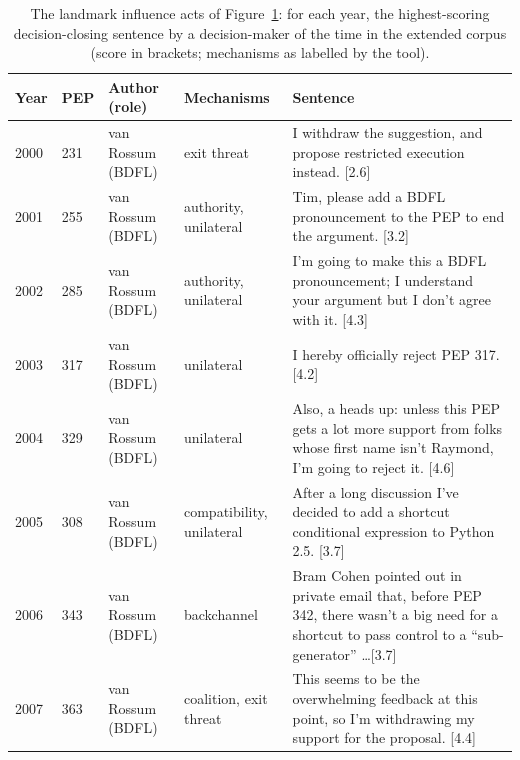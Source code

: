 \begin{figure}[t]
\label{fig:timeline2}
\end{figure}

\begin{table}[t]
\caption{The landmark influence acts of Figure~\ref{fig:timeline2}: for each year, the highest-scoring decision-closing sentence by a decision-maker of the time in the extended corpus (score in brackets; mechanisms as labelled by the tool).}
\label{tab:landmarks}
\footnotesize
\begin{tabular}{p{}p{}p{}p{}p{}}
\toprule
Year & PEP & Author (role) & Mechanisms & Sentence \\
\midrule
2000 & 231 & van Rossum (BDFL) & exit threat & I withdraw the suggestion, and propose restricted execution instead. [2.6] \\
2001 & 255 & van Rossum (BDFL) & authority, unilateral & Tim, please add a BDFL pronouncement to the PEP to end the argument. [3.2] \\
2002 & 285 & van Rossum (BDFL) & authority, unilateral & I'm going to make this a BDFL pronouncement; I understand your argument but I don't agree with it. [4.3] \\
2003 & 317 & van Rossum (BDFL) & unilateral & I hereby officially reject PEP 317. [4.2] \\
2004 & 329 & van Rossum (BDFL) & unilateral & Also, a heads up: unless this PEP gets a lot more support from folks whose first name isn't Raymond, I'm going to reject it. [4.6] \\
2005 & 308 & van Rossum (BDFL) & compatibility, unilateral & After a long discussion I've decided to add a shortcut conditional expression to Python 2.5. [3.7] \\
2006 & 343 & van Rossum (BDFL) & backchannel & Bram Cohen pointed out in private email that, before PEP 342, there wasn't a big need for a shortcut to pass control to a ``sub-generator'' \ldots [3.7] \\
2007 & 363 & van Rossum (BDFL) & coalition, exit threat & This seems to be the overwhelming feedback at this point, so I'm withdrawing my support for the proposal. [4.4] \\

\end{tabular}
\end{table}
